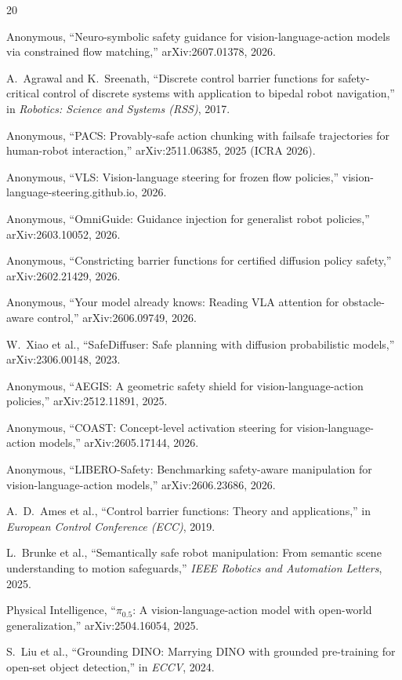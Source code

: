 \documentclass[conference]{IEEEtran}
\begin{document}

\begin{thebibliography}{20}

 Anonymous, ``Neuro-symbolic safety guidance for vision-language-action models via constrained flow matching,'' arXiv:2607.01378, 2026.

 A.~Agrawal and K.~Sreenath, ``Discrete control barrier functions for safety-critical control of discrete systems with application to bipedal robot navigation,'' in \emph{Robotics: Science and Systems (RSS)}, 2017.

 Anonymous, ``PACS: Provably-safe action chunking with failsafe trajectories for human-robot interaction,'' arXiv:2511.06385, 2025 (ICRA 2026).

 Anonymous, ``VLS: Vision-language steering for frozen flow policies,'' vision-language-steering.github.io, 2026.

 Anonymous, ``OmniGuide: Guidance injection for generalist robot policies,'' arXiv:2603.10052, 2026.

 Anonymous, ``Constricting barrier functions for certified diffusion policy safety,'' arXiv:2602.21429, 2026.

 Anonymous, ``Your model already knows: Reading VLA attention for obstacle-aware control,'' arXiv:2606.09749, 2026.

 W.~Xiao et al., ``SafeDiffuser: Safe planning with diffusion probabilistic models,'' arXiv:2306.00148, 2023.

 Anonymous, ``AEGIS: A geometric safety shield for vision-language-action policies,'' arXiv:2512.11891, 2025.

 Anonymous, ``COAST: Concept-level activation steering for vision-language-action models,'' arXiv:2605.17144, 2026.

 Anonymous, ``LIBERO-Safety: Benchmarking safety-aware manipulation for vision-language-action models,'' arXiv:2606.23686, 2026.

 A.~D.~Ames et al., ``Control barrier functions: Theory and applications,'' in \emph{European Control Conference (ECC)}, 2019.

 L.~Brunke et al., ``Semantically safe robot manipulation: From semantic scene understanding to motion safeguards,'' \emph{IEEE Robotics and Automation Letters}, 2025.

 Physical Intelligence, ``$\pi_{0.5}$: A vision-language-action model with open-world generalization,'' arXiv:2504.16054, 2025.

 S.~Liu et al., ``Grounding DINO: Marrying DINO with grounded pre-training for open-set object detection,'' in \emph{ECCV}, 2024.

\end{thebibliography}
\end{document}
